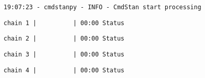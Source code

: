 \documentclass[11pt]{article}
\begin{document}
    \begin{Verbatim}[commandchars=\\\{\}]
19:07:23 - cmdstanpy - INFO - CmdStan start processing
    \end{Verbatim}

    
    \begin{Verbatim}[commandchars=\\\{\}]
chain 1 |          | 00:00 Status
    \end{Verbatim}

    
    
    \begin{Verbatim}[commandchars=\\\{\}]
chain 2 |          | 00:00 Status
    \end{Verbatim}

    
    
    \begin{Verbatim}[commandchars=\\\{\}]
chain 3 |          | 00:00 Status
    \end{Verbatim}

    
    
    \begin{Verbatim}[commandchars=\\\{\}]
chain 4 |          | 00:00 Status
    \end{Verbatim}

    
    \begin{Verbatim}[commandchars=\\\{\}]

    \end{Verbatim}
\end{document}
